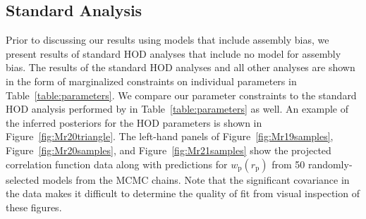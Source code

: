 \documentclass[usenatbib,usegraphicx,letterpaper]{mn2e}
\newcommand{\wprp}{w_{\mathrm{p}}}
\newcommand{\rp}{r_{\mathrm{p}}}
\begin{document}
\subsection{Standard Analysis}
\label{subsection:standard}

Prior to discussing our results using models that include assembly bias, we present 
results of standard HOD analyses that include no model for assembly bias. The results of 
the standard HOD analyses and all other analyses are shown in the form of marginalized 
constraints on individual parameters in Table~\ref{table:parameters}. We compare our parameter 
constraints to the standard HOD analysis performed by \citet{zehavi_etal11} in Table~\ref{table:parameters} 
as well. An example of the inferred posteriors for the HOD parameters is shown in Figure~\ref{fig:Mr20triangle}. 
The left-hand panels of Figure~\ref{fig:Mr19samples}, Figure~\ref{fig:Mr20samples}, and Figure~\ref{fig:Mr21samples} 
show the projected correlation function data along with predictions for $\wprp(\rp)$ from 50 randomly-selected 
models from the MCMC chains. Note that the significant covariance in the data makes it difficult to 
determine the quality of fit from visual inspection of these figures.
\end{document}
